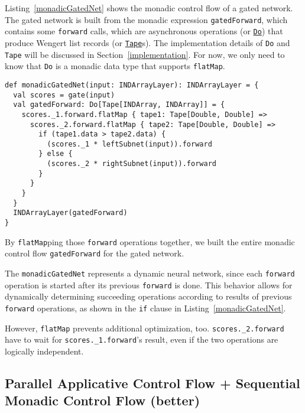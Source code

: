 Listing~\ref{monadicGatedNet} shows the monadic control flow of a gated network. The gated network is built from the monadic expression \lstinline{gatedForward}, which contains some \lstinline{forward} calls, which are asynchronous operations (or \href{https://javadoc.io/page/com.thoughtworks.raii/asynchronous_2.11/latest/com/thoughtworks/raii/asynchronous%24%24Do.html}{\lstinline{Do}}) that produce Wengert list records (or \href{https://javadoc.io/page/com.thoughtworks.deeplearning/deeplearning_2.11/latest/com/thoughtworks/deeplearning/DeepLearning%24%24Tape.html}{\lstinline{Tape}}s). The implementation details of \lstinline{Do} and \lstinline{Tape} will be discussed in Section~\ref{implementation}. For now, we only need to know that \lstinline{Do} is a monadic data type that supports \lstinline{flatMap}.

\begin{lstlisting}[float={h t b p},caption={Monadic gated network}, label={monadicGatedNet}]
def monadicGatedNet(input: INDArrayLayer): INDArrayLayer = {
  val scores = gate(input)
  val gatedForward: Do[Tape[INDArray, INDArray]] = {
    scores._1.forward.flatMap { tape1: Tape[Double, Double] =>
      scores._2.forward.flatMap { tape2: Tape[Double, Double] =>
        if (tape1.data > tape2.data) {
          (scores._1 * leftSubnet(input)).forward
        } else {
          (scores._2 * rightSubnet(input)).forward
        }
      }
    }
  }
  INDArrayLayer(gatedForward)
}
\end{lstlisting}

By \lstinline{flatMap}ping those \lstinline{forward} operations together, we built the entire monadic control flow \lstinline{gatedForward} for the gated network.

The \lstinline{monadicGatedNet} represents a dynamic neural network, since each \lstinline{forward} operation is started after its previous \lstinline{forward} is done. This behavior allows for dynamically determining succeeding operations according to results of previous \lstinline{forward} operations, as shown in the \lstinline{if} clause in Listing~\ref{monadicGatedNet}.

However, \lstinline{flatMap} prevents additional optimization, too.
\lstinline{scores._2.forward} have to wait for \lstinline{scores._1.forward}'s result, even if the two operations are logically independent.

\subsection{Parallel Applicative Control Flow + Sequential Monadic Control Flow (better)}
\label{applicative}

